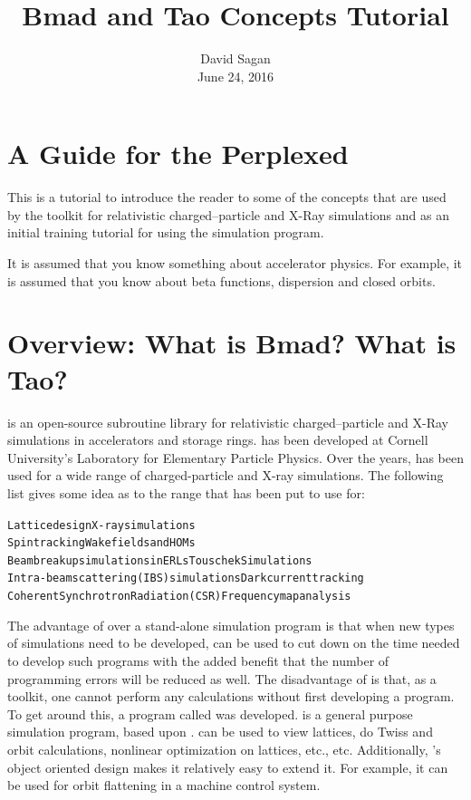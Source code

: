 \documentclass{hitec}
\title{Bmad and Tao Concepts Tutorial}
\author{}
\date{David Sagan \\ June 24, 2016}
\newcommand{\Section}[1]{\section{#1}\vspace*{-1ex}}
\newenvironment{display}
  {\vspace*{-1.5ex} \begin{alltt}}
  {\end{alltt} \vspace*{-1.0ex}}
\begin{document}
\maketitle

\tableofcontents

\Section{A Guide for the Perplexed}
\label{s:guide}

This is a tutorial to introduce the reader to some of the concepts that are used by the \bmad toolkit
for relativistic charged--particle and X-Ray simulations and as an initial training tutorial
for using the \tao simulation program.

It is assumed that you know something about accelerator physics. For example, it is assumed that
you know about beta functions, dispersion and closed orbits.

\Section{Overview: What is Bmad? What is Tao?}
\label{s:overview}

\bmad is an open-source subroutine library for relativistic charged--particle and X-Ray simulations
in accelerators and storage rings. \bmad has been developed at Cornell University's Laboratory for
Elementary Particle Physics.  Over the years, \bmad has been used for a wide range of
charged-particle and X-ray simulations. The following list gives some idea as to the range that
\bmad has been put to use for:
\begin{display}
  Lattice design                              X-ray simulations
  Spin tracking                               Wakefields and HOMs
  Beam breakup simulations in ERLs            Touschek Simulations
  Intra-beam scattering (IBS) simulations     Dark current tracking
  Coherent Synchrotron Radiation (CSR)        Frequency map analysis
\end{display}

The advantage of \bmad over a stand-alone simulation program is that when new types of simulations
need to be developed, \bmad can be used to cut down on the time needed to develop such programs
with the added benefit that the number of programming errors will be reduced
as well. The disadvantage of \bmad is that, as a toolkit, one cannot perform any calculations
without first developing a program. To get around this, a program called \tao was developed.
\tao is a general purpose simulation program, based upon \bmad. \tao can be used to view
lattices, do Twiss and orbit calculations, nonlinear optimization on lattices, etc., etc.
Additionally, \tao's object oriented design makes it relatively easy to extend it. For
example, it can be used for orbit flattening in a machine control system.
\end{document}
